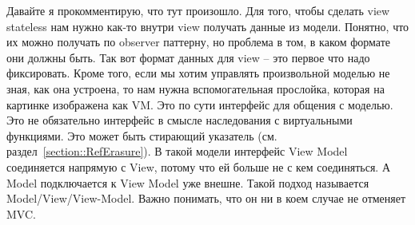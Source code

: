 Давайте я прокомментирую, что тут произошло.
Для того, чтобы сделать view stateless нам нужно как-то внутри view получать данные из модели.
Понятно, что их можно получать по observer паттерну, но проблема в том, в каком формате они должны быть.
Так вот формат данных для view -- это первое что надо фиксировать.
Кроме того, если мы хотим управлять произвольной моделью не зная, как она устроена, то нам нужна вспомогательная прослойка, которая на картинке изображена как VM.
Это по сути интерфейс для общения с моделью.
Это не обязательно интерфейс в смысле наследования с виртуальными функциями.
Это может быть стирающий указатель (см. раздел~\ref{section::RefErasure}).
В такой модели интерфейс View Model соединяется напрямую с View, потому что ей больше не с кем соединяться.
А Model подключается к View Model уже внешне.
Такой подход называется Model/View/View-Model.
Важно понимать, что он ни в коем случае не отменяет MVC.
